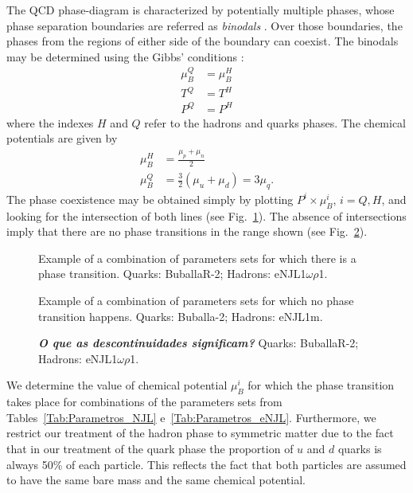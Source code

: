 \documentclass[prc, reprint, amsmath, floatfix, linenumbers,10pt]{revtex4-1}
\newcommand{\comment}[1]{{\bf\textit{#1}}}
\begin{document}
The QCD phase-diagram is characterized by potentially multiple phases, whose phase separation boundaries are referred as \emph{binodals} \cite{Mueller1995}. Over those boundaries, the phases from the regions of either side of the boundary can coexist. The binodals may be determined using the Gibbs' conditions \cite{Cavagnoli2011}:
\begin{align}
\mu_B^Q &= \mu_B^H \\
T^Q &= T^H \\
P^Q &= P^H
\end{align}
%
where the indexes $H$ and $Q$ refer to the hadrons and quarks phases. The chemical potentials are given by
\begin{align}
	\mu_B^H &= \frac{\mu_p + \mu_n}{2} \\
	\mu_B^Q &= \frac{3}{2} (\mu_u + \mu_d) = 3 \mu_q.
\end{align}
%
The phase coexistence may be obtained simply by plotting $P^i \times \mu_B^i$, $i = Q, H$, and looking for the intersection of both lines (see Fig.~\ref{Fig:Intersection}). The absence of intersections imply that there are no phase transitions in the range shown (see Fig.~\ref{Fig:NoIntersection}).

\begin{figure}
	
	\caption{Example of a combination of parameters sets for which there is a phase transition. Quarks: BuballaR-2; Hadrons: eNJL1$\omega\rho$1. \label{Fig:Intersection}}
\end{figure}

\begin{figure}
	
	\caption{Example of a combination of parameters sets for which no phase transition happens. Quarks: Buballa-2; Hadrons: eNJL1m. \label{Fig:NoIntersection}}
\end{figure}

\begin{figure}
	
	\caption{\comment{O que as descontinuidades significam?} Quarks: BuballaR-2; Hadrons: eNJL1$\omega\rho$1.}
\end{figure}

We determine the value of chemical potential $\mu_B^i$ for which the phase transition takes place for combinations of the parameters sets from Tables~\ref{Tab:Parametros_NJL} e~\ref{Tab:Parametros_eNJL}. Furthermore, we restrict our treatment of the hadron phase to symmetric matter due to the fact that in our treatment of the quark phase the proportion of $u$ and $d$ quarks is always 50\% of each particle. This reflects the fact that both particles are assumed to have the same bare mass and the same chemical potential.
\end{document}
